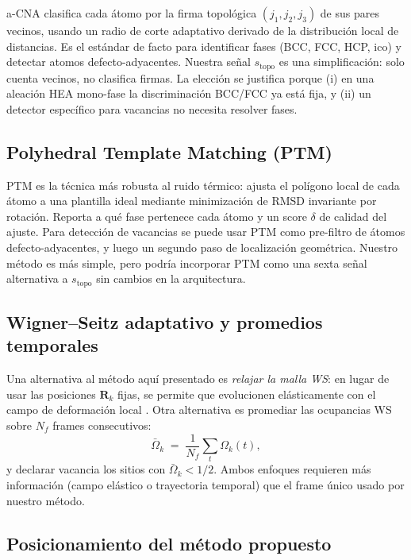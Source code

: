 \documentclass[11pt,a4paper]{article}
\theoremstyle{remark}
\begin{document}
a-CNA \cite{Stukowski2012} clasifica cada átomo por la firma
topológica $(j_1, j_2, j_3)$ de sus pares vecinos, usando un radio de
corte adaptativo derivado de la distribución local de distancias.
Es el estándar de facto para identificar fases (BCC, FCC, HCP, ico) y
detectar atomos defecto-adyacentes. Nuestra señal $s_\text{topo}$ es
una simplificación: solo cuenta vecinos, no clasifica firmas. La
elección se justifica porque (i) en una aleación HEA mono-fase la
discriminación BCC/FCC ya está fija, y (ii) un detector específico
para vacancias no necesita resolver fases.

\subsection{Polyhedral Template Matching (PTM)}

PTM \cite{Larsen2016} es la técnica más robusta al ruido térmico:
ajusta el polígono local de cada átomo a una plantilla ideal
mediante minimización de RMSD invariante por rotación. Reporta a
qué fase pertenece cada átomo y un score $\delta$ de calidad del
ajuste. Para detección de vacancias se puede usar PTM como
pre-filtro de átomos defecto-adyacentes, y luego un segundo paso de
localización geométrica. Nuestro método es más simple, pero podría
incorporar PTM como una sexta señal alternativa a $s_\text{topo}$
sin cambios en la arquitectura.

\subsection{Wigner--Seitz adaptativo y promedios temporales}

Una alternativa al método aquí presentado es \emph{relajar la malla
WS}: en lugar de usar las posiciones $\mathbf{R}_k$ fijas, se permite
que evolucionen elásticamente con el campo de deformación local
\cite{Soneda2003}. Otra alternativa es promediar las ocupancias WS
sobre $N_f$ frames consecutivos:
\begin{equation}
  \bar \Omega_k \;=\; \frac{1}{N_f}\sum_{t} \Omega_k(t),
\end{equation}
y declarar vacancia los sitios con $\bar \Omega_k < 1/2$. Ambos
enfoques requieren más información (campo elástico o trayectoria
temporal) que el frame único usado por nuestro método.

\subsection{Posicionamiento del método propuesto}
\end{document}

